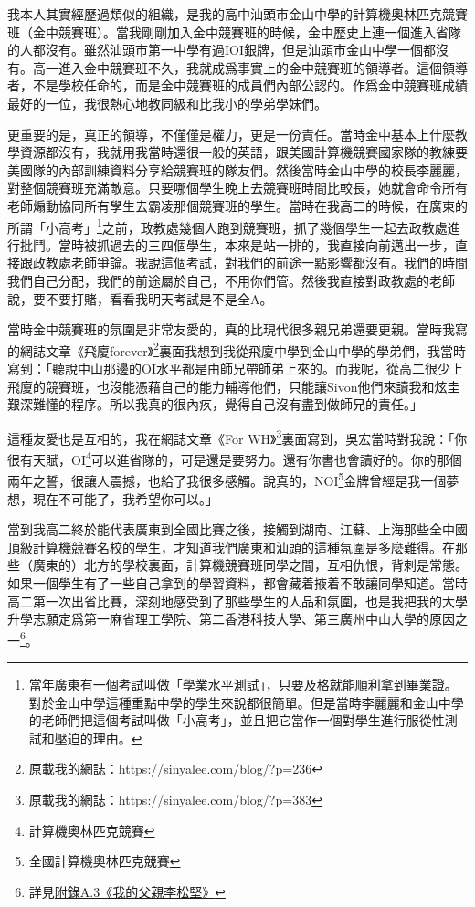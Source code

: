 我本人其實經歷過類似的組織，是我的高中汕頭市金山中學的計算機奧林匹克競賽班（金中競賽班）。當我剛剛加入金中競賽班的時候，金中歷史上連一個進入省隊的人都沒有。雖然汕頭市第一中學有過IOI銀牌，但是汕頭市金山中學一個都沒有。高一進入金中競賽班不久，我就成爲事實上的金中競賽班的領導者。這個領導者，不是學校任命的，而是金中競賽班的成員們內部公認的。作爲金中競賽班成績最好的一位，我很熱心地教同級和比我小的學弟學妹們。

更重要的是，真正的領導，不僅僅是權力，更是一份責任。當時金中基本上什麼教學資源都沒有，我就用我當時還很一般的英語，跟美國計算機競賽國家隊的教練要美國隊的內部訓練資料分享給競賽班的隊友們。然後當時金山中學的校長李麗麗，對整個競賽班充滿敵意。只要哪個學生晚上去競賽班時間比較長，她就會命令所有老師煽動協同所有學生去霸凌那個競賽班的學生。當時在我高二的時候，在廣東的所謂「小高考」\footnote{當年廣東有一個考試叫做「學業水平測試」，只要及格就能順利拿到畢業證。對於金山中學這種重點中學的學生來說都很簡單。但是當時李麗麗和金山中學的老師們把這個考試叫做「小高考」，並且把它當作一個對學生進行服從性測試和壓迫的理由。}之前，政教處幾個人跑到競賽班，抓了幾個學生一起去政教處進行批鬥。當時被抓過去的三四個學生，本來是站一排的，我直接向前邁出一步，直接跟政教處老師爭論。我說這個考試，對我們的前途一點影響都沒有。我們的時間我們自己分配，我們的前途屬於自己，不用你們管。然後我直接對政教處的老師說，要不要打賭，看看我明天考試是不是全A。

當時金中競賽班的氛圍是非常友愛的，真的比現代很多親兄弟還要更親。當時我寫的網誌文章《飛廈forever》\footnote{原載我的網誌：https://sinyalee.com/blog/?p=236}裏面我想到我從飛廈中學到金山中學的學弟們，我當時寫到：「聽說中山那邊的OI水平都是由師兄帶師弟上來的。而我呢，從高二很少上飛廈的競賽班，也沒能憑藉自己的能力輔導他們，只能讓Sivon他們來讀我和炫圭艱深難懂的程序。所以我真的很內疚，覺得自己沒有盡到做師兄的責任。」

這種友愛也是互相的，我在網誌文章《For WH》\footnote{原載我的網誌：https://sinyalee.com/blog/?p=383}裏面寫到，吳宏當時對我說：「你很有天賦，OI\footnote{計算機奧林匹克競賽}可以進省隊的，可是還是要努力。還有你書也會讀好的。你的那個兩年之誓，很讓人震撼，也給了我很多感觸。說真的，NOI\footnote{全國計算機奧林匹克競賽}金牌曾經是我一個夢想，現在不可能了，我希望你可以。」

當到我高二終於能代表廣東到全國比賽之後，接觸到湖南、江蘇、上海那些全中國頂級計算機競賽名校的學生，才知道我們廣東和汕頭的這種氛圍是多麼難得。在那些（廣東的）北方的學校裏面，計算機競賽班同學之間，互相仇恨，背刺是常態。如果一個學生有了一些自己拿到的學習資料，都會藏着掖着不敢讓同學知道。當時高二第一次出省比賽，深刻地感受到了那些學生的人品和氛圍，也是我把我的大學升學志願定爲第一麻省理工學院、第二香港科技大學、第三廣州中山大學的原因之一\footnote{詳見\hyperref[3faces]{附錄A.3《我的父親李松堅》}}。

